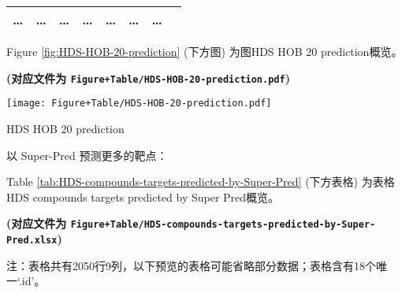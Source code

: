 \documentclass[
]{article}
\begin{document}
\begin{longtable}[]{@{}llllllll@{}}
\begin{minipage}[t]{0.11\columnwidth}
\ldots{}\strut
\end{minipage} & \begin{minipage}[t]{0.14\columnwidth}\raggedright
\ldots{}\strut
\end{minipage} & \begin{minipage}[t]{0.14\columnwidth}\raggedright
\ldots{}\strut
\end{minipage} & \begin{minipage}[t]{0.08\columnwidth}\raggedright
\ldots{}\strut
\end{minipage} & \begin{minipage}[t]{0.09\columnwidth}\raggedright
\ldots{}\strut
\end{minipage} & \begin{minipage}[t]{0.11\columnwidth}\raggedright
\ldots{}\strut
\end{minipage} & \begin{minipage}[t]{0.03\columnwidth}\raggedright
\ldots{}\strut
\end{minipage}\tabularnewline
\bottomrule
\end{longtable}

Figure \ref{fig:HDS-HOB-20-prediction} (下方图) 为图HDS HOB 20 prediction概览。

\textbf{(对应文件为 \texttt{Figure+Table/HDS-HOB-20-prediction.pdf})}

\def\@captype{figure}
\begin{center}
\texttt{[image: Figure+Table/HDS-HOB-20-prediction.pdf]}
\caption{HDS HOB 20 prediction}\label{fig:HDS-HOB-20-prediction}
\end{center}

以 Super-Pred 预测更多的靶点：

Table \ref{tab:HDS-compounds-targets-predicted-by-Super-Pred} (下方表格) 为表格HDS compounds targets predicted by Super Pred概览。

\textbf{(对应文件为 \texttt{Figure+Table/HDS-compounds-targets-predicted-by-Super-Pred.xlsx})}

\begin{center}\begin{tcolorbox}[colback=gray!10, colframe=gray!50, width=0.9\linewidth, arc=1mm, boxrule=0.5pt]注：表格共有2050行9列，以下预览的表格可能省略部分数据；表格含有18个唯一`.id'。
\end{tcolorbox}
\end{center}
\end{document}
